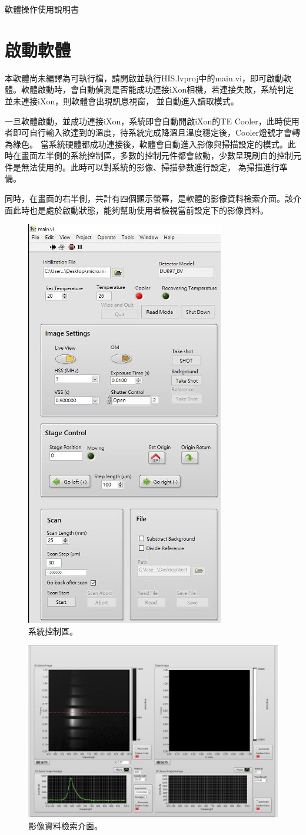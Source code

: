 \documentclass[12pt]{article}
\begin{document}
    \thispagestyle{empty}\newline
    {\large 軟體操作使用說明書}\newpage
    \tableofcontents\newpage
    \section{啟動軟體}
    本軟體尚未編譯為可執行檔，請開啟並執行HIS.lvproj中的main.vi，即可啟動軟體。軟體啟動時，會自動偵測是否能成功連接iXon相機，若連接失敗，系統判定並未連接iXon，則軟體會出現訊息視窗，
    並自動進入讀取模式。
    
    一旦軟體啟動，並成功連接iXon，系統即會自動開啟iXon的TE Cooler，此時使用者即可自行輸入欲達到的溫度，待系統完成降溫且溫度穩定後，Cooler燈號才會轉為綠色。
    當系統硬體都成功連接後，軟體會自動進入影像與掃描設定的模式。此時在畫面左半側的系統控制區，多數的控制元件都會啟動，少數呈現刷白的控制元件是無法使用的。此時可以對系統的影像、掃描參數進行設定，
    為掃描進行準備。

    同時，在畫面的右半側，共計有四個顯示螢幕，是軟體的影像資料檢索介面。該介面此時也是處於啟動狀態，能夠幫助使用者檢視當前設定下的影像資料。
    \begin{figure}[h]
        \centering
        \includegraphics[width=0.33\linewidth]{settingPanel.jpeg}
        \caption{系統控制區。}
    \end{figure}
    \begin{figure}[h]
        \centering
        \includegraphics[width=0.75\linewidth]{browsePanel.jpeg}
        \caption{影像資料檢索介面。}
    \end{figure}
\end{document}
